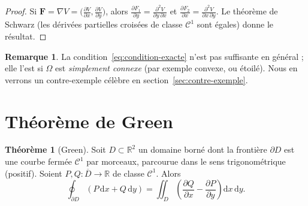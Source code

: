 \documentclass[12pt,a4paper,openany]{book}
\theoremstyle{definition}
\newtheorem{theoreme}{Théorème}[chapter]
\newtheorem{remarque}{Remarque}[chapter]
\newcommand{\R}{\mathbb{R}}
\newcommand{\dd}{\mathrm{d}}
\begin{document}
\begin{proof}
  Si $\mathbf{F} = \nabla V = \bigl(\frac{\partial V}{\partial x},
  \frac{\partial V}{\partial y}\bigr)$, alors
  $\frac{\partial F_1}{\partial y} = \frac{\partial^2 V}{\partial y\,
  \partial x}$ et $\frac{\partial F_2}{\partial x} = \frac{\partial^2 V}
  {\partial x\,\partial y}$. Le théorème de Schwarz
  (les dérivées partielles croisées de classe $\mathcal{C}^1$ sont
  égales) donne le résultat.
\end{proof}

\begin{remarque}\label{rem:condition-suffisante}
  La condition~\eqref{eq:condition-exacte} n'est pas suffisante en
  général ; elle l'est si $\Omega$ est \emph{simplement
  connexe} (par exemple convexe, ou étoilé).
  Nous en verrons un contre-exemple célèbre en section~\ref{sec:contre-exemple}.
\end{remarque}



\section{Théorème de Green}
\label{sec:theoreme-green}


\begin{theoreme}[Green]\label{thm:green}
  Soit $D \subset \R^2$ un domaine borné dont la frontière $\partial D$
  est une courbe fermée $\mathcal{C}^1$ par morceaux, parcourue dans le
  sens trigonométrique (positif). Soient $P, Q\colon \overline{D}\to\R$
  de classe $\mathcal{C}^1$. Alors
  \begin{equation}\label{eq:green}
    \oint_{\partial D}(P\,\dd x + Q\,\dd y)
    = \iint_D \left(\frac{\partial Q}{\partial x}
    - \frac{\partial P}{\partial y}\right)\dd x\,\dd y.
  \end{equation}
\end{theoreme}

\begin{center}
\end{center}
\end{document}

